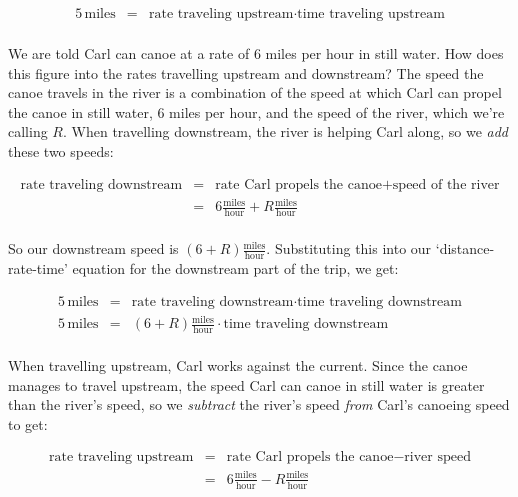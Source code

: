{\[\begin{array}{rcl}
5 \, \text{miles} & = & \text{rate traveling upstream} \cdot \text{time traveling upstream} \\ \end{array} \]

We are told Carl can canoe at a  rate of $6$ miles per hour in still water.  How does this figure into the rates travelling upstream and downstream?  The speed the canoe travels in the river is a combination of the speed at which Carl can propel the canoe in still water, 6 miles per hour,  and the speed of the river, which we're calling $R$. When travelling downstream, the river is helping Carl along, so we \textit{add} these two speeds: 

\[ \begin{array}{rcl}

\text{rate traveling downstream} & = & \text{rate Carl propels the canoe} + \text{speed of the river} \\

 & = & 6 \frac{\text{miles}}{\text{hour}} + R \frac{\text{miles}}{\text{hour}} \\ \end{array} \]
 
 So our downstream speed is $(6+R) \frac{\text{miles}}{\text{hour}}$.  Substituting this into our `distance-rate-time' equation for the downstream part of the trip, we get:
 
 \[ \begin{array}{rcl}

5 \, \text{miles} & = & \text{rate traveling downstream} \cdot \text{time traveling downstream} \\ 

5 \, \text{miles} & = & (6+R) \frac{\text{miles}}{\text{hour}} \cdot \text{time traveling downstream} \\ 	\end{array} \]

 When travelling upstream, Carl works against the current.  Since the canoe manages to travel upstream,  the speed Carl can canoe in still water is greater than the river's speed, so we \textit{subtract} the river's speed \textit{from} Carl's canoeing speed to get:
 
 \[ \begin{array}{rcl}

\text{rate traveling upstream} & = & \text{rate Carl propels the canoe} - \text{river speed} \\

 & = & 6 \frac{\text{miles}}{\text{hour}} - R \frac{\text{miles}}{\text{hour}} \\ \end{array} \]
 
}
